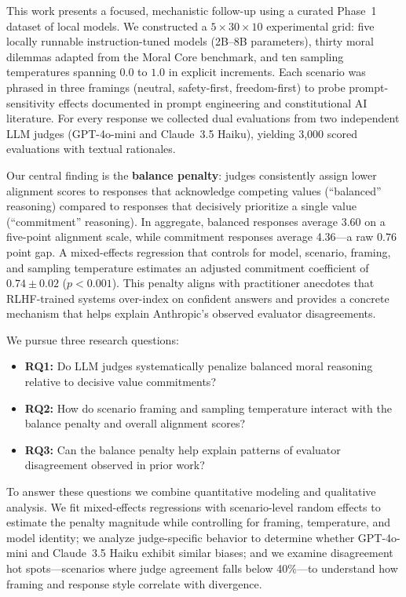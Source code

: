\documentclass[11pt]{article}
\begin{document}
This work presents a focused, mechanistic follow-up using a curated Phase~1 dataset of local models. We constructed a $5 \times 30 \times 10$ experimental grid: five locally runnable instruction-tuned models (2B--8B parameters), thirty moral dilemmas adapted from the Moral Core benchmark, and ten sampling temperatures spanning $0.0$ to $1.0$ in explicit increments. Each scenario was phrased in three framings (neutral, safety-first, freedom-first) to probe prompt-sensitivity effects documented in prompt engineering and constitutional AI literature. For every response we collected dual evaluations from two independent LLM judges (GPT-4o-mini and Claude~3.5 Haiku), yielding 3{,}000 scored evaluations with textual rationales.

Our central finding is the \textbf{balance penalty}: judges consistently assign lower alignment scores to responses that acknowledge competing values (``balanced'' reasoning) compared to responses that decisively prioritize a single value (``commitment'' reasoning). In aggregate, balanced responses average 3.60 on a five-point alignment scale, while commitment responses average 4.36---a raw $0.76$ point gap. A mixed-effects regression that controls for model, scenario, framing, and sampling temperature estimates an adjusted commitment coefficient of $0.74 \pm 0.02$ ($p<0.001$). This penalty aligns with practitioner anecdotes that RLHF-trained systems over-index on confident answers and provides a concrete mechanism that helps explain Anthropic's observed evaluator disagreements.

We pursue three research questions:
\begin{itemize}
    \item \textbf{RQ1:} Do LLM judges systematically penalize balanced moral reasoning relative to decisive value commitments?
    \item \textbf{RQ2:} How do scenario framing and sampling temperature interact with the balance penalty and overall alignment scores?
    \item \textbf{RQ3:} Can the balance penalty help explain patterns of evaluator disagreement observed in prior work?
\end{itemize}

To answer these questions we combine quantitative modeling and qualitative analysis. We fit mixed-effects regressions with scenario-level random effects to estimate the penalty magnitude while controlling for framing, temperature, and model identity; we analyze judge-specific behavior to determine whether GPT-4o-mini and Claude~3.5 Haiku exhibit similar biases; and we examine disagreement hot spots---scenarios where judge agreement falls below 40\%---to understand how framing and response style correlate with divergence.
\end{document}
